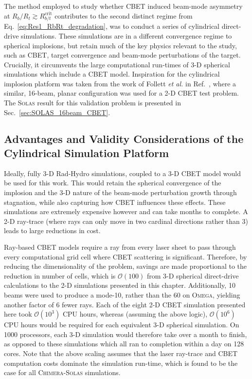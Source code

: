 The method employed to study whether \ac{CBET} induced beam-mode asymmetry at $R_b/R_t\gtrsim R_{b/t}^{\text{crit}}$ contributes to the second distinct regime from Eq.~\ref{eq:Res1_RbRt_degradation}, was to conduct a series of cylindrical direct-drive simulations.
These simulations are in a different convergence regime to spherical implosions, but retain much of the key physics relevant to the study, such as \ac{CBET}, target convergence and beam-mode perturbations of the target.
Crucially, it circumvents the large computational run-times of 3-D spherical simulations which include a \ac{CBET} model.
Inspiration for the cylindrical implosion platform was taken from the work of Follett \textit{et al.} in Ref.~\cite{follett_validation_2022}, where a similar, 16-beam, planar configuration was used for a 2-D \ac{CBET} test problem.
The \textsc{Solas} result for this validation problem is presented in Sec.~\ref{sec:SOLAS_16beam_CBET}.

\subsection{Advantages and Validity Considerations of the Cylindrical Simulation Platform}%
\label{sec:Res1_platformvalidity}

Ideally, fully 3-D \ac{Rad-Hydro} simulations, coupled to a 3-D \ac{CBET} model would be used for this work.
This would retain the spherical convergence of the implosion and the 3-D nature of the beam-mode perturbation growth through stagnation, while also capturing how \ac{CBET} influences these effects.
These simulations are extremely expensive however and can take months to complete.
A 2-D ray-trace (where rays can only move in two cardinal directions rather than 3) leads to large reductions in cost.

Ray-based \ac{CBET} models require a ray from every laser sheet to pass through every computational grid cell where \ac{CBET} scattering is significant.
Therefore, by reducing the dimensionality of the problem, savings are made proportional to the reduction in number of cells, which is $\mathcal{O}(100)$ from 3-D spherical direct-drive calculations to the 2-D simulations presented in this chapter.
Additionally, 10 beams were used to produce a mode-10, rather than the 60 on \textsc{Omega}, yielding another factor of 6 fewer rays.
Each of the eight 2-D \ac{CBET} simulation presented here took $\mathcal{O}\left(10^3\right)$ CPU hours, whereas (assuming the above logic), $\mathcal{O}\left(10^6\right)$ CPU hours would be required for each equivalent 3-D spherical simulation.
On 1000 processors, each 3-D simulation would therefore take over a month to finish, as opposed to these simulations which all ran to completion within a day on 128 cores.
Note that the above scaling assumes that the laser ray-trace and \ac{CBET} computation costs dominate the simulation run-time, which is found to be the case for all \textsc{Chimera}-\textsc{Solas} simulations.

